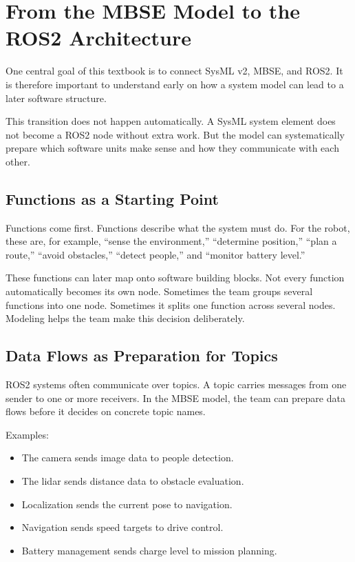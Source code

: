 \section{From the MBSE Model to the ROS2 Architecture}
One central goal of this textbook is to connect SysML v2, MBSE, and ROS2. It is therefore important to understand early on how a system model can lead to a later software structure.

This transition does not happen automatically. A SysML system element does not become a ROS2 node without extra work. But the model can systematically prepare which software units make sense and how they communicate with each other.

\subsection{Functions as a Starting Point}
Functions come first. Functions describe what the system must do. For the robot, these are, for example, \enquote{sense the environment,} \enquote{determine position,} \enquote{plan a route,} \enquote{avoid obstacles,} \enquote{detect people,} and \enquote{monitor battery level.}

These functions can later map onto software building blocks. Not every function automatically becomes its own node. Sometimes the team groups several functions into one node. Sometimes it splits one function across several nodes. Modeling helps the team make this decision deliberately.

\subsection{Data Flows as Preparation for Topics}
ROS2 systems often communicate over topics. A topic carries messages from one sender to one or more receivers. In the MBSE model, the team can prepare data flows before it decides on concrete topic names.

Examples:

\begin{itemize}
    \item The camera sends image data to people detection.
    \item The lidar sends distance data to obstacle evaluation.
    \item Localization sends the current pose to navigation.
    \item Navigation sends speed targets to drive control.
    \item Battery management sends charge level to mission planning.
\end{itemize}

